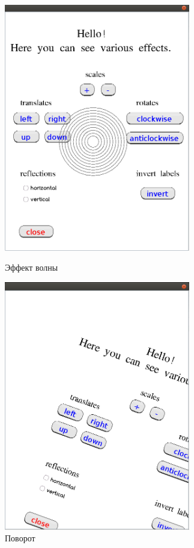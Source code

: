 \documentclass[14pt]{extarticle}
\begin{document}
	\begin{figure}[h]
		\begin{center}
		\begin{minipage}[h]{0.4\linewidth}
		\includegraphics[width=230pt]{pictures/demo21.png}
		\caption{ Эффект волны} %
		\label{ris:demo1} %
		\end{minipage}
		\hfill 
		\begin{minipage}[h]{0.4\linewidth}
		\includegraphics[width=230pt]{pictures/demo23.png}
		\caption{Поворот}
		\label{ris:demo2}
		\end{minipage}
		\end{center}
		
			\end{figure}
		
\end{document}
